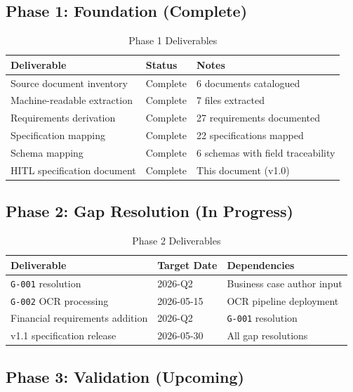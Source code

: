 \documentclass[11pt,a4paper,twoside]{report}
\newcommand{\gapref}[1]{\texttt{#1}}
\begin{document}
\subsection{Phase 1: Foundation (Complete)}

\begin{table}[h]
\centering
\caption{Phase 1 Deliverables}
\label{tab:phase1-deliverables}
\begin{tabularx}{\textwidth}{@{}L{5cm}C{2.5cm}L{6cm}@{}}
\toprule
\textbf{Deliverable} & \textbf{Status} & \textbf{Notes} \\
\midrule
Source document inventory & Complete & 6 documents catalogued \\
Machine-readable extraction & Complete & 7 files extracted \\
Requirements derivation & Complete & 27 requirements documented \\
Specification mapping & Complete & 22 specifications mapped \\
Schema mapping & Complete & 6 schemas with field traceability \\
HITL specification document & Complete & This document (v1.0) \\
\bottomrule
\end{tabularx}
\end{table}

\subsection{Phase 2: Gap Resolution (In Progress)}

\begin{table}[h]
\centering
\caption{Phase 2 Deliverables}
\label{tab:phase2-deliverables}
\begin{tabularx}{\textwidth}{@{}L{5cm}C{2.5cm}L{6cm}@{}}
\toprule
\textbf{Deliverable} & \textbf{Target Date} & \textbf{Dependencies} \\
\midrule
\gapref{G-001} resolution & 2026-Q2 & Business case author input \\
\gapref{G-002} OCR processing & 2026-05-15 & OCR pipeline deployment \\
Financial requirements addition & 2026-Q2 & \gapref{G-001} resolution \\
v1.1 specification release & 2026-05-30 & All gap resolutions \\
\bottomrule
\end{tabularx}
\end{table}

\subsection{Phase 3: Validation (Upcoming)}
\end{document}
